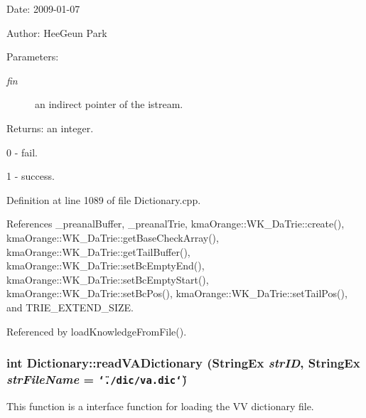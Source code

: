 \begin{Desc}
\item[Date:]2009-01-07 \end{Desc}
\begin{Desc}
\item[Author:]HeeGeun Park \end{Desc}
\begin{Desc}
\item[Parameters:]
\begin{description}
\item[{\em fin}]an indirect pointer of the istream. \end{description}
\end{Desc}
\begin{Desc}
\item[Returns:]an integer.\par
 0 - fail.\par
 1 - success. \end{Desc}


Definition at line 1089 of file Dictionary.cpp.

References \_\-preanalBuffer, \_\-preanalTrie, kmaOrange::WK\_\-DaTrie::create(), kmaOrange::WK\_\-DaTrie::getBaseCheckArray(), kmaOrange::WK\_\-DaTrie::getTailBuffer(), kmaOrange::WK\_\-DaTrie::setBcEmptyEnd(), kmaOrange::WK\_\-DaTrie::setBcEmptyStart(), kmaOrange::WK\_\-DaTrie::setBcPos(), kmaOrange::WK\_\-DaTrie::setTailPos(), and TRIE\_\-EXTEND\_\-SIZE.

Referenced by loadKnowledgeFromFile().\hypertarget{classkmaOrange_1_1Dictionary_61ab96ce9ca3047c4f05cf7de7bad1b6}{
\subsubsection[{readVADictionary}]{\setlength{\rightskip}{0pt plus 5cm}int Dictionary::readVADictionary ({\bf StringEx} {\em strID}, \/  {\bf StringEx} {\em strFileName} = {\tt \char`\"{}./dic/va.dic\char`\"{}})}}
\label{classkmaOrange_1_1Dictionary_61ab96ce9ca3047c4f05cf7de7bad1b6}


This function is a interface function for loading the VV dictionary file. 

